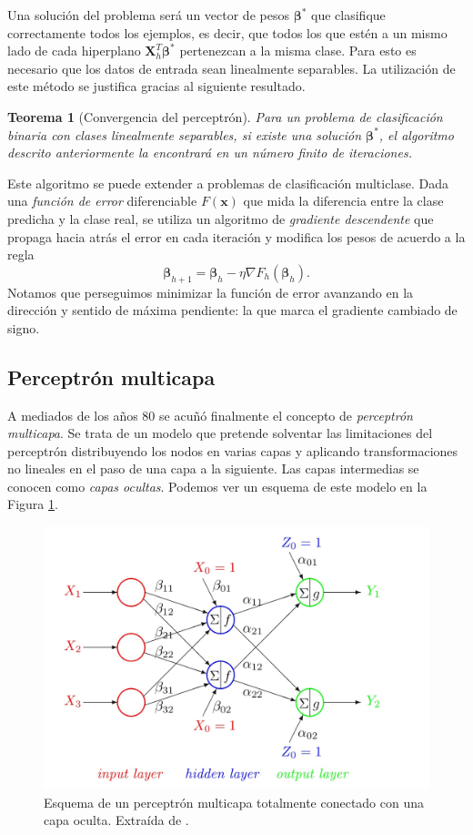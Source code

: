 \documentclass[
  a4paper,
  12pt,
  spanish,
]{scrartcl}
\theoremstyle{teorema-style}
\newtheorem*{nth}{Teorema}
\begin{document}
Una solución del problema será un vector de pesos $\pmb \beta^\ast$ que clasifique correctamente todos los ejemplos, es decir, que todos los que estén a un mismo lado de cada hiperplano $\pmb X_h^T \pmb \beta^\ast$ pertenezcan a la misma clase. Para esto es necesario que los datos de entrada sean linealmente separables. La utilización de este método se justifica gracias al siguiente resultado.

\begin{nth}[Convergencia del perceptrón]
Para un problema de clasificación binaria con clases linealmente separables, si existe una solución $\pmb \beta^\ast$, el algoritmo descrito anteriormente la encontrará en un número finito de iteraciones.
\end{nth}

Este algoritmo se puede extender a problemas de clasificación multiclase. Dada una \textit{función de error} diferenciable $F(\pmb x)$ que mida la diferencia entre la clase predicha y la clase real, se utiliza un algoritmo de \textit{gradiente descendente} que propaga hacia atrás el error en cada iteración y modifica los pesos de acuerdo a la regla
\[
\pmb \beta_{h+1} = \pmb \beta_h - \eta \nabla F_h(\pmb \beta_h).
\]
Notamos que perseguimos minimizar la función de error avanzando en la dirección y sentido de máxima pendiente: la que marca el gradiente cambiado de signo.

\subsection{Perceptrón multicapa}

A mediados de los años 80 se acuñó finalmente el concepto de \textit{perceptrón multicapa}. Se trata de un modelo que pretende solventar las limitaciones del perceptrón distribuyendo los nodos en varias capas y aplicando transformaciones no lineales en el paso de una capa a la siguiente. Las capas intermedias se conocen como \textit{capas ocultas}. Podemos ver un esquema de este modelo en la Figura \ref{fig:multi}.

\begin{figure}[h]
  \centering
  \includegraphics[width=.8\textwidth]{img/multicapa}
  \caption{Esquema de un perceptrón multicapa totalmente conectado con una capa oculta. Extraída de \parencite{izenman_modern_2008}.}
  \label{fig:multi}
\end{figure}
\end{document}
